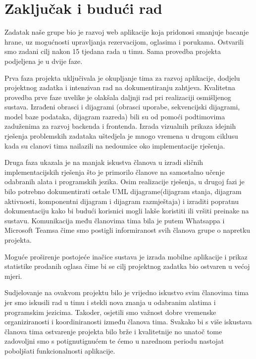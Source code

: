 \chapter{Zaključak i budući rad}
		
		Zadatak naše grupe bio je razvoj web aplikacije koja pridonosi smanjuje bacanje hrane, uz mogućnosti upravljanja rezervacijom, oglasima i porukama. Ostvarili smo zadani cilj nakon 15 tjedana rada u timu. Sama provedba projekta podjeljena je u dvije faze.
		
		Prva faza projekta uključivala je okupljanje tima za razvoj aplikacije, dodjelu projektnog zadatka i intenzivan rad na dokumentiranju zahtjeva. Kvalitetna provedba prve faze uvelike je olakšala daljnji rad pri realizaciji osmišljenog sustava. Izrađeni obrasci i dijagrami (obrasci uporabe, sekvencijski dijagrami, model baze podataka, dijagram razreda) bili su od pomoći podtimovima zaduženima za razvoj backenda i frontenda. Izrada vizualnih prikaza idejnih rješenja problemskih zadataka uštedjela je mnogo vremena u drugom ciklusu kada su clanovi tima nailazili na nedoumice oko implementacije rješenja.
		 
		Druga faza ukazala je na manjak iskustva članova u izradi sličnih implementacijskih rješenja što je primorilo članove na samostalno učenje odabranih alata i programskih jezika. Osim realizacije rješenja, u drugoj fazi je bilo potrebno dokumentirati ostale UML dijagrame(dijagram stanja, dijagram aktivnosti, komponentni dijagram i dijagram razmještaja) i izraditi popratnu dokumentaciju kako bi budući korisnici mogli lakše koristiti ili vršiti preinake na sustavu. Komunikacija među članovima tima bila je putem Whatsappa i Microsoft Teamsa čime smo postigli informiranost svih članova grupe o napretku projekta. 
		 
		Moguće proširenje postojeće inačice sustava je izrada mobilne aplikacije i prikaz statistike prodanih oglasa čime bi se cilj projektnog zadatka bio ostvaren u većoj mjeri.
		 
		Sudjelovanje na ovakvom projektu bilo je vrijedno iskustvo svim članovima tima jer smo iskusili rad u timu i stekli nova znanja u odabranim alatima i programskim jezicima. Takoder, osjetili smo važnost dobre vremenske organiziranosti i koordiniranosti između članova tima. Svakako bi s više iskustava članova tima ostvarenje projekta bilo brže i kvalitetnije no unatoč tome zadovoljni smo s potignutignućem te ćemo u narednom periodu nastojat poboljšati funkcionalnosti aplikacije.
		
		\eject 